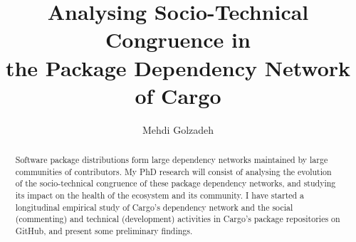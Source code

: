 



\pagestyle{plain}

\usepackage{amssymb}%
\usepackage{pifont}%

\newcommand{\commentty}[1]{{\color{blue} \sf (TY: #1)}}
\newcommand{\commentlh}[1]{{\color{red} \sf (LH: #1)}}

\def\BibTeX{{\rm B\kern-.05em{\sc i\kern-.025em b}\kern-.08em
		T\kern-.1667em\lower.7ex\hbox{E}\kern-.125emX}}





	
\title{Analysing Socio-Technical Congruence in\\ the Package Dependency Network of Cargo}

	\author{Mehdi Golzadeh}
	
	\newcommand*{\Scale}[2][4]{\scalebox{#1}{$#2$}}%
	\newcommand{\Tool}{ComAir\xspace}
	\newcommand{\ComBugs}{30\xspace}
	
	
	
	
	
\begin{abstract}
Software package distributions form large dependency networks maintained by large communities of contributors. My PhD research will consist of analysing the evolution of the socio-technical congruence of these package dependency networks, and studying its impact on the health of the ecosystem and its community.
I have started a longitudinal empirical study of Cargo's dependency network and the social (commenting) and technical (development) activities in Cargo's package repositories on GitHub, and present some preliminary findings.
\end{abstract}
	
